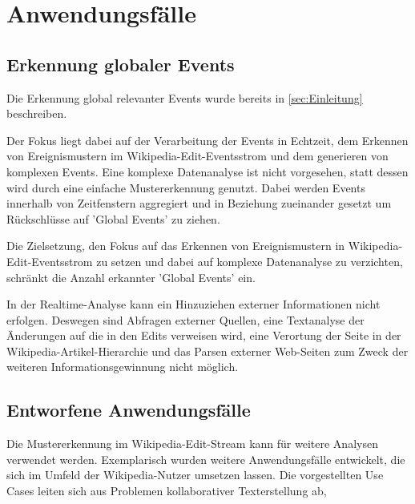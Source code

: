 \section{Anwendungsfälle}
\subsection{Erkennung globaler Events}
Die Erkennung global relevanter Events wurde bereits in \ref{sec:Einleitung} beschreiben.

Der Fokus liegt dabei auf der Verarbeitung der Events in Echtzeit, dem Erkennen von Ereignismustern im Wikipedia-Edit-Eventsstrom und dem generieren von komplexen Events. Eine komplexe Datenanalyse ist nicht vorgesehen, statt dessen wird durch eine einfache Mustererkennung genutzt. Dabei werden Events innerhalb von Zeitfenstern aggregiert und in Beziehung zueinander gesetzt um Rückschlüsse auf 'Global Events' zu ziehen.

Die Zielsetzung, den Fokus auf das Erkennen von Ereignismustern in Wikipedia-Edit-Eventsstrom zu setzen und dabei auf komplexe Datenanalyse zu verzichten, schränkt die Anzahl erkannter 'Global Events' ein.

In der Realtime-Analyse kann ein Hinzuziehen externer Informationen nicht erfolgen. Deswegen sind Abfragen externer Quellen, eine Textanalyse der Änderungen auf die in den Edits verweisen wird, eine Verortung der Seite in der Wikipedia-Artikel-Hierarchie und das Parsen externer Web-Seiten zum Zweck der weiteren Informationsgewinnung nicht möglich. 



\subsection{Entworfene Anwendungsfälle}
Die Mustererkennung im Wikipedia-Edit-Stream kann für weitere Analysen verwendet werden. Exemplarisch wurden weitere Anwendungsfälle entwickelt, die sich im Umfeld der Wikipedia-Nutzer umsetzen lassen. Die vorgestellten Use Cases leiten sich aus Problemen kollaborativer Texterstellung ab, 

